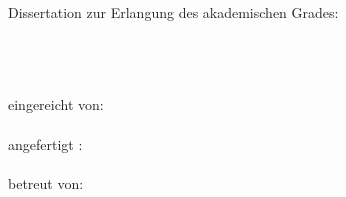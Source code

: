 \null
\vspace{2\baselineskip}
\noindent
Dissertation zur Erlangung des akademischen Grades: \\
\tDegree \\
\vspace{\baselineskip}
\noindent \\
\tTitle \\
\vspace{\baselineskip}

\noindent
eingereicht von: \\
\tAuthor \\

\noindent
angefertigt \InOderAm{\tDepartment}: \\
\tDepartment \\

\noindent
betreut von: \\
\tSupervisor \\

\noindent
\tSubmissionMonth{}~\tSubmissionYear \\
\vspace{5\baselineskip}
